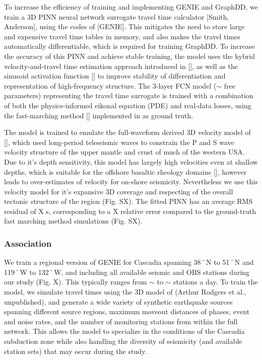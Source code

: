 \documentclass[review]{seismica}
\begin{document}
To increase the efficiency of training and implementing GENIE and
GraphDD, we train a 3D PINN neural network surrogate travel time
calculator {[}Smith, Anderson{]}, using the codes of {[}GENIE{]}. This
mitigates the need to store large and expensive travel time tables in
memory, and also makes the travel times automatically differentiable,
which is required for training GraphDD. To increase the accuracy of this
PINN and achieve stable training, the model uses the hybrid
velocity-and-travel time estimation approach introduced in {[}{]}, as
well as the sinusoid activation function {[}{]} to improve stability of
differentiation and representation of high-frequency structure. The
3-layer FCN model (\ensuremath{\sim} free parameters) representing the
travel time surrogate is trained with a combination of both the
physics-informed eikonal equation (PDE) and real-data losses, using the
fast-marching method {[}{]} implemented in as ground truth.

The model is trained to emulate the full-waveform derived 3D velocity
model of {[}{]}, which used long-period teleseismic waves to constrain
the P and S wave velocity structure of the upper mantle and crust of
much of the western USA. Due to it's depth sensitivity, this model has
largely high velocities even at shallow depths, which is suitable for
the offshore basaltic rheology domains {[}{]}, however leads to
over-estimates of velocity for on-shore seismicity. Nevertheless we use
this velocity model for it's expansive 3D coverage and respecting of the
overall tectonic structure of the region (Fig. SX). The fitted PINN has
an average RMS residual of X s, corresponding to a X relative error
compared to the ground-truth fast marching method simulations (Fig. SX).

\subsubsection{Association}\label{association}

We train a regional version of GENIE for Cascadia spanning 38˚N to 51˚N
and 119˚W to 132˚W, and including all available seismic and OBS stations
during our study (Fig. X). This typically ranges from \ensuremath{\sim}
to \ensuremath{\sim} stations a day. To train the model, we simulate
travel times using the 3D model of (Arthur Rodgers et al., unpublished),
and generate a wide variety of synthetic earthquake sources spanning
different source regions, maximum moveout distances of phases, event and
noise rates, and the number of monitoring stations from within the full
network. This allows the model to specialize in the conditions of the
Cascadia subduction zone while also handling the diversity of seismicity
(and available station sets) that may occur during the study.
\end{document}
